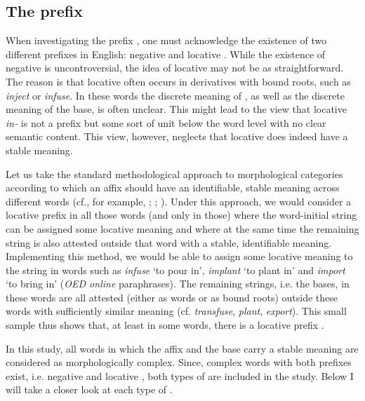 \subsection{The prefix } \label{theory:in}

When investigating the prefix , one must acknowledge the existence of two different prefixes in English: negative  and locative . While the existence of negative  is uncontroversial, the idea of locative  may not be as straightforward. The reason is that locative  often occurs in derivatives with bound roots, such as \textit{inject} or \textit{infuse}. In these words the discrete meaning of , as well as the discrete meaning of the base, is often unclear. This might lead to the view that locative \textit{in-} is not a prefix but some sort of unit below the word level with  no clear semantic content. This view, however, neglects that locative  does indeed have a stable meaning.  

Let us take the standard methodological approach to morphological categories according to which an affix should have an identifiable, stable meaning across different words (cf., for example, \citealt[chapter 5.2.2]{Plag.1999}; \citealt[63ff.]{Stockwell.2001}; \citealt[68]{Schulte.2015}). Under this approach, we would consider  a locative prefix in all those words (and only in those) where the word-initial string  can be assigned some locative meaning and where at the same time the remaining string is also attested outside that word with a stable, identifiable meaning.
Implementing this method, we would be able to assign some locative meaning to the string  in words such as \textit{infuse} `to pour in', \textit{implant} `to plant in' and \textit{import} `to bring in' (\textit{OED online} paraphrases). The remaining strings, i.e. the bases, in these words are all attested (either as words or as bound roots) outside these words with sufficiently similar meaning (cf. \textit{transfuse}, \textit{plant}, \textit{export}). This small sample thus shows that, at least in some words, there is a locative prefix . 


In this study, all words in which the affix and the base carry a stable meaning are considered as morphologically complex.  Since, complex words with both prefixes exist, i.e. negative and locative , both types of  are included in the study.  Below I will take a closer look at each type of .




